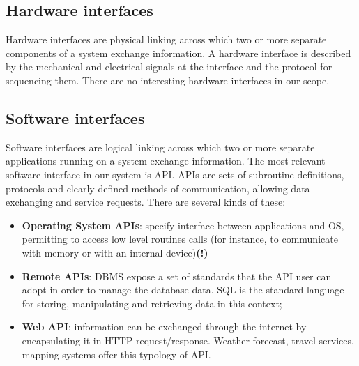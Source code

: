 \subsection{Hardware interfaces}
Hardware interfaces are physical linking across which two or more separate components of a system exchange information. A hardware interface is described by the mechanical and electrical signals at the interface and the protocol for sequencing them. There are no interesting hardware interfaces in our scope.

\subsection{Software interfaces}
Software interfaces are logical linking across which two or more separate applications running on a system exchange information. The most relevant software interface in our system is API. APIs are sets of subroutine definitions, protocols and clearly defined methods of communication, allowing data exchanging and service requests. There are several kinds of these:
\begin{itemize}
\item \textbf{Operating System APIs}: specify interface between applications and OS, permitting to access low level routines calls (for instance, to communicate with memory or with an internal device)\textbf{(!)}
\item \textbf{Remote APIs}: DBMS expose a set of standards that the API user can adopt in order to manage the database data. SQL is the standard language for storing, manipulating and retrieving data in this context;
\item \textbf{Web API}: information can be exchanged through the internet by encapsulating it in HTTP request/response. Weather forecast, travel services, mapping systems offer this typology of API.
\end{itemize}

